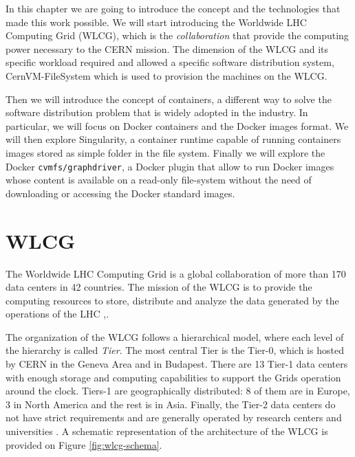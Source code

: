 In this chapter we are going to introduce the concept and the technologies that
made this work possible.  We will start introducing the Worldwide LHC Computing
Grid (WLCG), which is the \textit{collaboration} that provide the computing power
necessary to the CERN mission. The dimension of the WLCG and its specific
workload required and allowed a specific software distribution system,
CernVM-FileSystem which is used to provision the machines on the WLCG.

Then we will introduce the concept of containers, a different way to solve the
software distribution problem that is widely adopted in the industry. In
particular, we will focus on Docker containers and the Docker images format. We
will then explore Singularity, a container runtime capable of running
containers images stored as simple folder in the file system. Finally we will
explore the Docker \texttt{cvmfs/graphdriver}, a Docker plugin that allow to
run Docker images whose content is available on a read-only file-system without
the need of downloading or accessing the Docker standard images.


\section{WLCG}

The Worldwide LHC Computing Grid is a global collaboration of more than 170
data centers in 42 countries.  The mission of the WLCG is to provide the
computing resources to store, distribute and analyze the data generated by the
operations of the LHC \cite{grid:website},\cite{grid:report}.

The organization of the WLCG follows a hierarchical model, where each level of
the hierarchy is called \textit{Tier}. The most central Tier is the Tier-0,
which is hosted by CERN in the Geneva Area and in Budapest. There are 13 Tier-1
data centers with enough storage and computing capabilities to support the
Grids operation around the clock.  Tiers-1 are geographically distributed: 8 of
them are in Europe, 3 in North America and the rest is in Asia. Finally, the
Tier-2 data centers do not have strict requirements and are generally operated
by research centers and universities \cite{grid:report}.  A schematic
representation of the architecture of the WLCG is provided on Figure
\ref{fig:wlcg-schema}.


